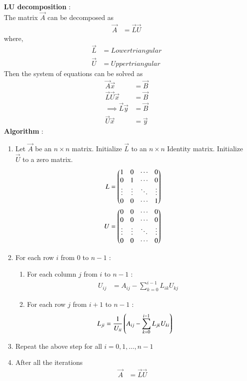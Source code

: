 \documentclass[journal]{IEEEtran}
\begin{document}
\textbf{LU decomposition} : \\
The matrix $\vec{A}$ can be decomposed as
\begin{align}
	\vec{A} &= \vec{L} \vec{U}
\end{align}
where, 
\begin{align}
	\vec{L} &= Lower triangular \\
	\vec{U} &= Upper triangular
\end{align}
Then the system of equations can be solved as
\begin{align}
	\vec{A} \vec{x} &= \vec{B} \label{eq:solve}\\
	\vec{L} \vec{U} \vec{x} &= \vec{B} \\
	\implies \vec{L} \vec{y} &= \vec{B} \label{eq:lu1} \\
	\vec{U} \vec{x} &= \vec{y} \label{eq:lu2}
\end{align}
\textbf{Algorithm} : \\
\begin{enumerate}
	\item Let $\vec{A}$ be an $n \times n$ matrix. Initialize $\vec{L}$ to an $n \times n$ Identity matrix. Initialize $\vec{U}$ to a zero matrix.
	\begin{align}
		L &= \begin{pmatrix}1 & 0 & \cdots & 0 \\
		            0 & 1 & \cdots & 0 \\
		            \vdots & \vdots & \ddots & \vdots \\
		            0 & 0 & \cdots & 1\end{pmatrix} \\
		U &= \begin{pmatrix}0 & 0 & \cdots & 0 \\
			    0 & 0 & \cdots & 0 \\
                            \vdots & \vdots & \ddots & \vdots \\
                            0 & 0 & \cdots & 0\end{pmatrix}
	\end{align}
	\item For each row $i$ from $0$ to $n-1$ :
	\begin{enumerate}
		\item For each column $j$ from $i$ to $n-1$ : 
		\begin{align}
			U_{ij} &= A_{ij} - \sum_{k=0}^{i-1} L_{ik} U_{kj}
		\end{align}
		\item For each row $j$ from $i+1$ to $n-1$ :
		\begin{align}
			L_{ji} &= \frac{1}{U_{ii}} \left(A_{ij} - \sum_{k=0}^{i-1} L_{jk} U_{ki}\right)
		\end{align}
	\end{enumerate}
	\item Repeat the above step for all $i = 0,1,\dots,n-1$
	\item After all the iterations
	\begin{align}
		\vec{A} &= \vec{L} \vec{U}
	\end{align}
\end{enumerate}
\end{document}
